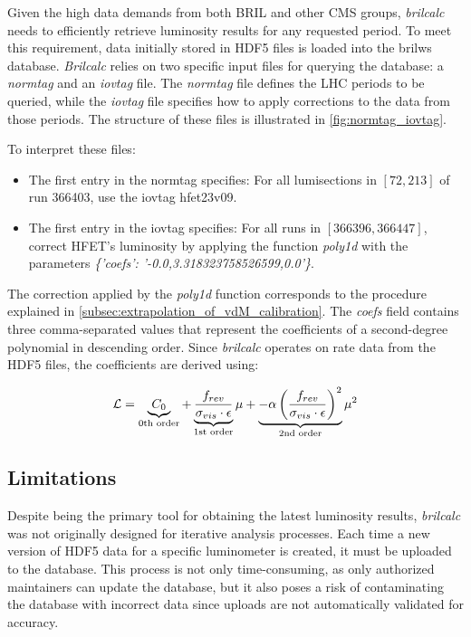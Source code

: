 Given the high data demands from both BRIL and other CMS groups, \textit{brilcalc} needs to efficiently retrieve luminosity results for any requested period. To meet this requirement, data initially stored in HDF5 files is loaded into the brilws database. \textit{Brilcalc} relies on two specific input files for querying the database: a \textit{normtag} and an \textit{iovtag} file. The \textit{normtag} file defines the LHC periods to be queried, while the \textit{iovtag} file specifies how to apply corrections to the data from those periods. The structure of these files is illustrated in \autoref{fig:normtag_iovtag}.

To interpret these files:
\begin{itemize}
	\item The first entry in the normtag specifies: For all lumisections in $[72, 213]$ of run 366403, use the iovtag hfet23v09.
	\item The first entry in the iovtag specifies: For all runs in $[366396, 366447]$, correct HFET's luminosity by applying the function \textit{poly1d} with the parameters \textit{\{'coefs': '-0.0,3.318323758526599,0.0'\}}.
\end{itemize}

The correction applied by the \textit{poly1d} function corresponds to the procedure explained in \autoref{subsec:extrapolation_of_vdM_calibration}. The \textit{coefs} field contains three comma-separated values that represent the coefficients of a second-degree polynomial in descending order. Since \textit{brilcalc} operates on rate data from the HDF5 files, the coefficients are derived using:

\begin{equation}
    \centering
    \mathcal{L} = \underbrace{C_0}_{\text{0th order}} + \underbrace{\frac{f_{rev}}{\sigma_{vis} \cdot \epsilon}}_{\text{1st order}} \mu + \underbrace{- \alpha \left( \frac{f_{rev}}{\sigma_{vis} \cdot \epsilon} \right)^{2}}_{\text{2nd order}} \mu^2
    \label{eq:brilcalc_poly1d}
\end{equation}

\subsection{Limitations}

Despite being the primary tool for obtaining the latest luminosity results, \textit{brilcalc} was not originally designed for iterative analysis processes. Each time a new version of HDF5 data for a specific luminometer is created, it must be uploaded to the database. This process is not only time-consuming, as only authorized maintainers can update the database, but it also poses a risk of contaminating the database with incorrect data since uploads are not automatically validated for accuracy.

